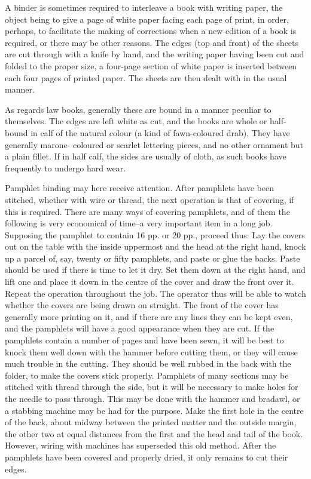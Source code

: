\documentclass[twoside]{book}
\begin{document}
A binder is sometimes required to interleave a
book with writing paper, the object being to give a
page of white paper facing each page of print, in
order, perhaps, to facilitate the making of corrections
when a new edition of a book is required, or
there may be other reasons. The edges (top and
front) of the sheets are cut through with a knife by
hand, and the writing paper having been cut and
folded to the proper size, a four-page section of
white paper is inserted between each four pages of
printed paper. The sheets are then dealt with in
the usual manner.

\pagebreak

As regards law books, generally these are bound
in a manner peculiar to themselves. The edges are
left white as cut, and the books are whole or half-
bound in calf of the natural colour (a kind of
fawn-coloured drab). They have generally marone-
coloured or scarlet lettering pieces, and no other
ornament but a plain fillet. If in half calf, the
sides are usually of cloth, as such books have
frequently to undergo hard wear.

Pamphlet binding may here receive attention.
After pamphlets have been stitched, whether with
wire or thread, the next operation is that of
covering, if this is required. There are many ways of
covering pamphlets, and of them the following is
very economical of time--a very important item in
a long job. Supposing the pamphlet to contain
16 pp. or 20 pp., proceed thus: Lay the covers out
on the table with the inside uppermost and the
head at the right hand, knock up a parcel of, say,
twenty or fifty pamphlets, and paste or glue the
backs. Paste should be used if there is time to let
it dry. Set them down at the right hand, and lift
one and place it down in the centre of the cover and
draw the front over it. Repeat the operation
throughout the job. The operator thus will be able
to watch whether the covers are being drawn on
straight. The front of the cover has generally
more printing on it, and if there are any lines they
can be kept even, and the pamphlets will have a
good appearance when they are cut. If the pamphlets
contain a number of pages and have been sewn,
it will be best to knock them well down with the
hammer before cutting them, or they will cause
much trouble in the cutting. They should be well
rubbed in the back with the folder, to make the
covers stick properly. Pamphlets of many sections
may be stitched with thread through the side, but
it will be necessary to make holes for the needle to
pass through. This may be done with the hammer
\pagebreak
and bradawl, or a stabbing machine may be had for
the purpose. Make the first hole in the centre of
the back, about midway between the printed matter
and the outside margin, the other two at equal
distances from the first and the head and tail of the
book. However, wiring with machines has superseded
this old method. After the pamphlets have been
covered and properly dried, it only remains to
cut their edges.
\end{document}

